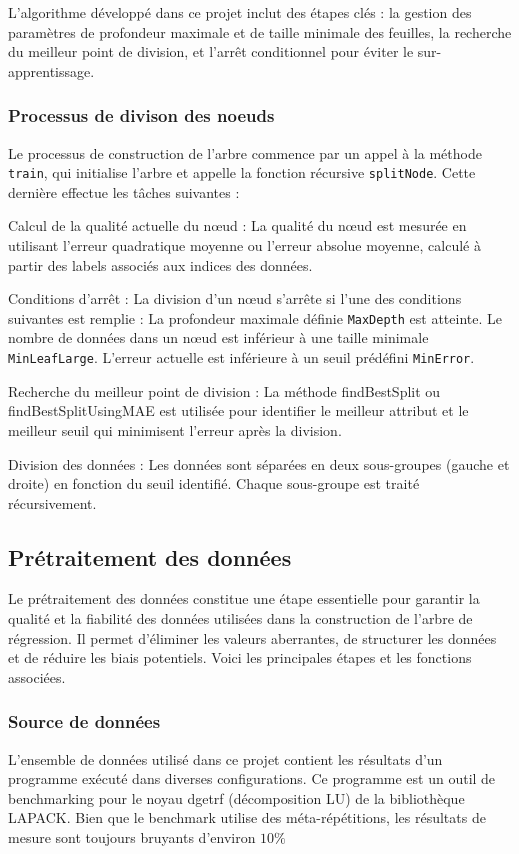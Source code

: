 \documentclass{rapportECL2024}
\newcommand{\var}[1]{\texttt{#1}}
\newcommand{\func}[1]{\small\texttt{#1}}
\begin{document}
L'algorithme développé dans ce projet inclut des étapes clés : la gestion des paramètres de profondeur maximale et de taille minimale des feuilles, la recherche du meilleur point de division, et l'arrêt conditionnel pour éviter le sur-apprentissage.

\subsubsection{Processus de divison des noeuds}
Le processus de construction de l'arbre commence par un appel à la méthode \func{train}, qui initialise l'arbre et appelle la fonction récursive \func{splitNode}. Cette dernière effectue les tâches suivantes :

Calcul de la qualité actuelle du nœud : La qualité du nœud est mesurée en utilisant l'erreur quadratique moyenne ou l'erreur absolue moyenne, calculé à partir des labels associés aux indices des données.

Conditions d'arrêt : La division d'un nœud s'arrête si l'une des conditions suivantes est remplie :
La profondeur maximale définie \var{MaxDepth} est atteinte.
Le nombre de données dans un nœud est inférieur à une taille minimale \var{MinLeafLarge}.
L'erreur actuelle est inférieure à un seuil prédéfini \var{MinError}.

Recherche du meilleur point de division : La méthode findBestSplit ou findBestSplitUsingMAE est utilisée pour identifier le meilleur attribut et le meilleur seuil qui minimisent l'erreur après la division.

Division des données : Les données sont séparées en deux sous-groupes (gauche et droite) en fonction du seuil identifié. Chaque sous-groupe est traité récursivement.

\subsection{Prétraitement des données}
Le prétraitement des données constitue une étape essentielle pour garantir la qualité et la fiabilité des données utilisées dans la construction de l'arbre de régression. Il permet d'éliminer les valeurs aberrantes, de structurer les données et de réduire les biais potentiels. Voici les principales étapes et les fonctions associées.


\subsubsection{Source de données}
L'ensemble de données utilisé dans ce projet contient les résultats d'un programme exécuté dans diverses configurations. Ce programme est un outil de benchmarking pour le noyau dgetrf (décomposition LU) de la bibliothèque LAPACK. Bien que le benchmark utilise des méta-répétitions, les résultats de mesure sont toujours bruyants d'environ $10\%$
\end{document}
